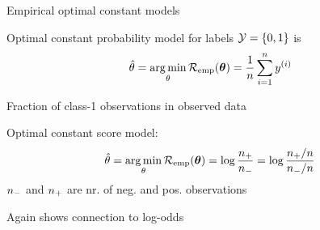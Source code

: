 \documentclass[11pt,compress,t,notes=noshow, xcolor=table]{beamer}
\begin{document}
\begin{vbframe}{Empirical optimal constant models}


\begin{itemizeL}
\item Optimal constant probability model for labels $\mathcal{Y} = \{0, 1\}$ is 
$$\hat{\theta} = \mathop{\mathrm{arg\,min}}_{\theta} \mathcal{R}_{\text{emp}}(\bm{\theta}) = \frac{1}{n} \sum\limits_{i=1}^n y^{(i)}$$
\item Fraction of class-1 observations in observed data
\item Optimal constant score model:
$$\hat{\theta} = \mathop{\mathrm{arg\,min}}_{\theta} \mathcal{R}_{\text{emp}}(\bm{\theta}) = \log \frac{n_{+}}{n_{-}} = \log \frac{n_{+} / n}{n_{-} /n}$$ 
$n_{-}$ and $n_{+}$ are nr.  of neg. and pos. observations
\item Again shows connection to log-odds 
\end{itemizeL}

\end{vbframe}


    


\end{document}
